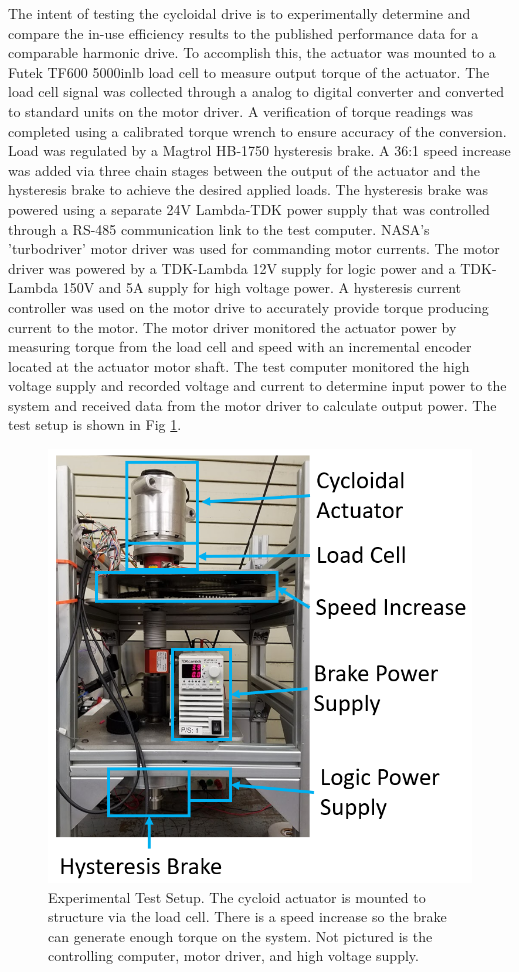 The intent of testing the cycloidal drive is to experimentally determine and compare the in-use efficiency results to the published performance data for a comparable harmonic drive.
To accomplish this, the actuator was mounted to a Futek TF600 5000inlb load cell to measure output torque of the actuator.
The load cell signal was collected through a analog to digital converter and converted to standard units on the motor driver.
A verification of torque readings was completed using a calibrated torque wrench to ensure accuracy of the conversion.
Load was regulated by a Magtrol HB-1750 hysteresis brake.
A 36:1 speed increase was added via three chain stages between the output of the actuator and the hysteresis brake to achieve the desired applied loads.
The hysteresis brake was powered using a separate 24V Lambda-TDK power supply that was controlled through a RS-485 communication link to the test computer.
NASA's 'turbodriver' motor driver was used for commanding motor currents.
The motor driver was powered by a TDK-Lambda 12V supply for logic power and a TDK-Lambda 150V and 5A supply for high voltage power.
A hysteresis current controller was used on the motor drive to accurately provide torque producing current to the motor.
The motor driver monitored the actuator power by measuring torque from the load cell and speed with an incremental encoder located at the actuator motor shaft.
The test computer monitored the high voltage supply and recorded voltage and current to determine input power to the system and received data from the motor driver to calculate output power.
The test setup is shown in Fig \ref{fig:test_setup}.

\begin{figure}[h]
   \centering
   \includegraphics[width=0.75\linewidth]{fig/test_stand}
   \caption{Experimental Test Setup.
   The cycloid actuator is mounted to structure via the load cell.
   There is a speed increase so the brake can generate enough torque on the system.
   Not pictured is the controlling computer, motor driver, and high voltage supply.}
   \label{fig:test_setup}
\end{figure}

